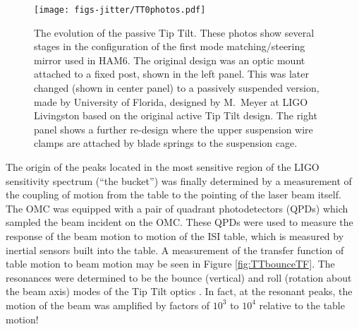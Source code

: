 \begin{figure}
  \begin{center}
  \leavevmode
  \texttt{[image: figs-jitter/TT0photos.pdf]}
  \end{center}
  \caption[The evolution of the passive Tip Tilt.]{The evolution of the passive Tip Tilt. These photos show several stages in the configuration of the first mode matching/steering mirror used in HAM6. The original design was an optic mount attached to a fixed post, shown in the left panel. This was later changed (shown in center panel) to a passively suspended version, made by University of Florida, designed by M.\ Meyer at LIGO Livingston based on the original active Tip Tilt design. The right panel shows a further re-design where the upper suspension wire clamps are attached by blade springs to the suspension cage.}
  \label{fig:TT0photos}
\end{figure}

The origin of the peaks located in the most sensitive region of the LIGO sensitivity spectrum (``the bucket'') was finally determined by a measurement of the coupling of motion from the table to the pointing of the laser beam itself. %
The OMC was equipped with a pair of quadrant photodetectors (QPDs) which sampled the beam incident on the OMC. %
These QPDs were used to measure the response of the beam motion to motion of the ISI table, which is measured by inertial sensors built into the table. %
A measurement of the transfer function of table motion to beam motion may be seen in Figure \ref{fig:TTbounceTF}. %
The resonances were determined to be the bounce (vertical) and roll (rotation about the beam axis) modes of the Tip Tilt optics \cite{tt1bounce}. %
In fact, at the resonant peaks, the motion of the beam was amplified by factors of $10^3$ to $10^4$ relative to the table motion!

